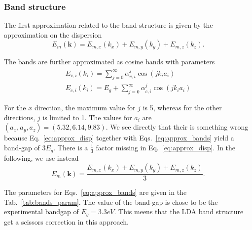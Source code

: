 \documentclass[a4paper,11pt]{report}
\renewcommand{\vec}[1]{\mathbf{#1}}
\begin{document}
\subsubsection{Band structure}

The first approximation related to the band-structure is given by the approximation on the dispersion
\begin{equation}
 E_m(\vec{k}) = E_{m,x}(k_x) + E_{m,y}(k_y) + E_{m,z}(k_z).
 \label{eq:approx_disp}
\end{equation}

The bands are further approximated as cosine bands with parameters
\begin{subequations}
 \begin{align}
  E_{v,i}(k_i) = \sum_{j=0}^{\infty} \alpha^{j}_{v,i} \cos(j k_ia_i)\\
  E_{c,i}(k_i) = E_g + \sum_{j=0}^{\infty} \alpha^{j}_{c,i} \cos(j k_ia_i)
 \end{align}
 \label{eq:approx_bands}
\end{subequations}

For the $x$ direction, the maximum value for $j$ is 5, whereas for the other directions, $j$ is limited to 1.\cite{PhysRevB.91.064302} The values for $a_i$ are $(a_x,a_y,a_z) = (5.32,6.14,9.83)$.
We see directly that their is something wrong because Eq.~\ref{eq:approx_disp} together with Eqs.~\ref{eq:approx_bands} yield a band-gap of $3E_g$. There is a $\frac{1}{3}$ factor missing in Eq.~\ref{eq:approx_disp}.
In the following, we use instead
\begin{equation}
 E_m(\vec{k}) = \frac{E_{m,x}(k_x) + E_{m,y}(k_y) + E_{m,z}(k_z)}{3}.
 \label{eq:approx_disp2}
\end{equation}

The parameters for Eqs.~\ref{eq:approx_bands} are given in the Tab.~\ref{tab:bands_param}. The value of the band-gap is chose to be the experimental bandgap of $E_g=3.3eV$.\cite{PhysRevB.91.064302} This meens that the LDA band structure get a scissors correction in this approach.
\end{document}
